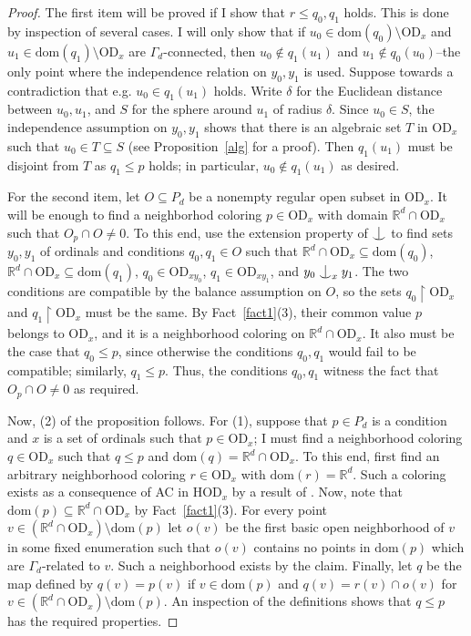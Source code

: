 \documentclass{article}
\newcommand{\gd}{\delta}
\newcommand{\dom}{\mathrm{dom}}
\newcommand{\hvd}{\mathrm{HOD}}
\newcommand{\vd}{\mathrm{OD}}
\newcommand{\forkindep}[1][]{%
  \mathrel{
    \mathop{
      \vcenter{
        \hbox{\oalign{\noalign{\kern-.3ex}\hfil$\vert$\hfil\cr
              \noalign{\kern-.7ex}
              $\smile$\cr\noalign{\kern-.3ex}}}
      }
    }\displaylimits_{#1}
  }
}
\theoremstyle{definition}
\begin{document}
\begin{proof}
The first item will be proved if I show that $r\leq q_0, q_1$ holds. This is done by inspection of several cases. I will only show that if $u_0\in\dom(q_0)\setminus\vd_x$ and $u_1\in\dom(q_1)\setminus\vd_x$ are $\Gamma_d$-connected, then $u_0\notin q_1(u_1)$ and $u_1\notin q_0(u_0)$--the only point where the independence relation on $y_0, y_1$ is used. Suppose towards a contradiction that e.g. $u_0\in q_1(u_1)$ holds. Write $\gd$ for the Euclidean distance between $u_0, u_1$, and $S$ for the sphere around $u_1$ of radius $\gd$. Since $u_0\in S$, the independence assumption on $y_0, y_1$ shows that there is an algebraic set $T$ in $\vd_x$ such that $u_0\in T\subseteq S$ (see Proposition~\ref{alg} for a proof). Then $q_1(u_1)$ must be disjoint from $T$ as $q_1\leq p$ holds; in particular, $u_0\notin q_1(u_1)$ as desired.

For the second item, let $O\subseteq P_d$ be a nonempty regular open subset in $\vd_x$. It will be enough to find a neighborhod coloring $p\in\vd_x$ with domain $\mathbb{R}^d\cap\vd_x$ such that $O_p\cap O\neq 0$. To this end, use the extension property of $\forkindep$ to find sets $y_0, y_1$ of ordinals and conditions $q_0, q_1\in O$ such that $\mathbb{R}^d\cap\vd_x\subseteq\dom(q_0)$, $\mathbb{R}^d\cap\vd_x\subseteq\dom(q_1)$, $q_0\in\vd_{xy_0}$, $q_1\in\vd_{xy_1}$, and $y_0\forkindep[x]y_1$. The two conditions are compatible by the balance assumption on $O$, so the sets $q_0\restriction\vd_x$ and $q_1\restriction\vd_x$ must be the same. By Fact~\ref{fact1}(3), their common value $p$ belongs to $\vd_x$, and it is a neighborhood coloring on $\mathbb{R}^d\cap\vd_x$. It also must be the case that $q_0\leq p$, since otherwise the conditions $q_0, q_1$ would fail to be compatible; similarly, $q_1\leq p$. Thus, the conditions $q_0, q_1$ witness the fact that $O_p\cap O\neq 0$ as required.

Now, (2) of the proposition follows. For (1), suppose that $p\in P_d$ is a condition and $x$ is a set of ordinals such that $p\in\vd_x$; I must find a neighborhood coloring $q\in\vd_x$ such that $q\leq p$ and $\dom(q)=\mathbb{R}^d\cap\vd_x$. To this end, first find an arbitrary neighborhood coloring $r\in\vd_x$ with $\dom(r)=\mathbb{R}^d$. Such a coloring exists as a consequence of AC in $\hvd_x$ by a result of \cite{z:twographgames}. Now, note that $\dom(p)\subseteq\mathbb{R}^d\cap\vd_x$ by Fact~\ref{fact1}(3). For every point $v\in(\mathbb{R}^d\cap\vd_x)\setminus\dom(p)$ let $o(v)$ be the first basic open neighborhood of $v$ in some fixed enumeration such that $o(v)$ contains no points in $\dom(p)$ which are $\Gamma_d$-related to $v$. Such a neighborhood exists by the claim. Finally, let $q$ be the map defined by $q(v)=p(v)$ if $v\in\dom(p)$ and $q(v)=r(v)\cap o(v)$ for $v\in (\mathbb{R}^d\cap\vd_x)\setminus\dom(p)$. An inspection of the definitions shows that $q\leq p$ has the required properties.
\end{proof}
\end{document}
